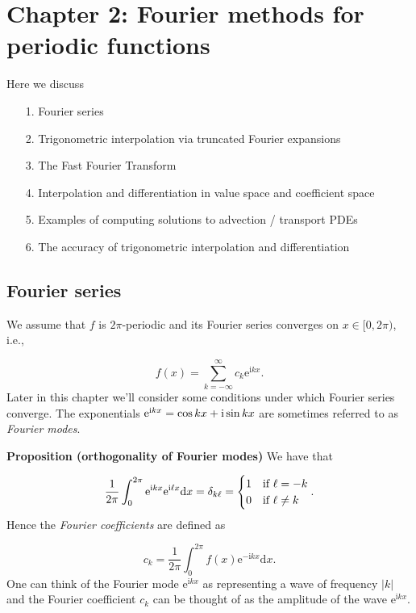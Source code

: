 \documentclass[12pt,landscape]{article}
\begin{document}
{\Huge
\sf
\section{Chapter 2: Fourier methods for periodic functions}
Here we discuss

\begin{itemize}
\item[1. ] Fourier series


\item[2. ] Trigonometric interpolation via truncated Fourier expansions 


\item[3. ] The Fast Fourier Transform


\item[4. ] Interpolation and differentiation in value space and coefficient space


\item[5. ] Examples of computing solutions to advection / transport PDEs


\item[6. ] The accuracy of trigonometric interpolation and differentiation

\end{itemize}
\newpage
\subsection{Fourier series}
We assume that $f$ is $2\pi$-periodic and its Fourier series converges on $x \in [0, 2\pi)$, i.e.,

\[
f(x) = \sum_{k=-\infty}^{\infty} c_k \mathrm{e}^{\mathrm{i} k x}.
\]
Later in this chapter we'll consider some conditions under which Fourier series converge. The exponentials $\mathrm{e}^{\mathrm{i} k x} = \cos kx + {\rm i} \sin kx$ are sometimes referred to as \emph{Fourier modes}.

\textbf{Proposition (orthogonality of Fourier modes)} We have that

\[
\frac{1}{2\pi}\int_{0}^{2\pi} \mathrm{e}^{\mathrm{i} k x} \mathrm{e}^{\mathrm{i} \ell x} {\rm d}x = \delta_{k\ell} = \begin{cases}
1 & \text{if } \ell = -k \\
0 & \text{if } \ell \neq k
\end{cases}.
\]
Hence the \emph{Fourier coefficients} are defined as

\[
c_k = \frac{1}{2\pi}\int_{0}^{2\pi} f(x) \mathrm{e}^{-\mathrm{i}k x} \mathrm{d} x.
\]
One can think of the Fourier mode $\mathrm{e}^{\mathrm{i} k x}$ as representing a wave of frequency $\vert k \vert$ and the Fourier coefficient $c_{k}$ can be thought of as the amplitude of the wave $\mathrm{e}^{\mathrm{i} k x}$.

}
\end{document}
